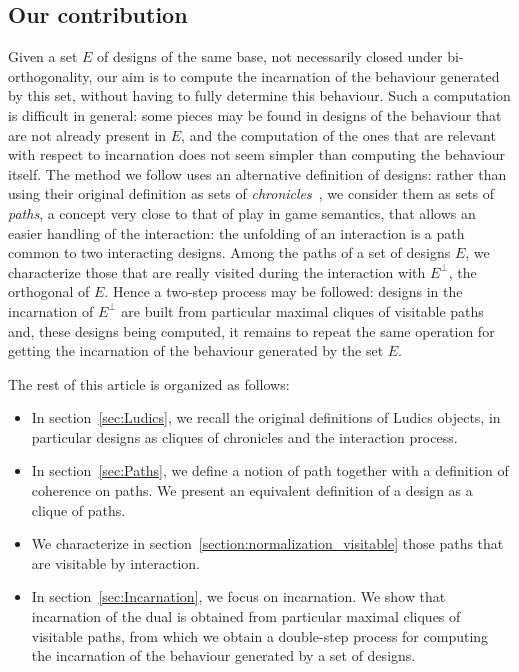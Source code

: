 \documentclass{LMCS}
\begin{document}
{\subsection{Our contribution}

Given a set $E$ of designs of the same base, not necessarily closed under bi-orthogonality, our aim is to compute the incarnation of the behaviour generated by this set, without having to fully determine this behaviour. 
Such a computation is difficult in general:
some pieces may be found in designs of the behaviour that are not already present in $E$, and the computation of the ones that are relevant with respect to incarnation does not seem simpler than computing the behaviour itself. 
The method we follow uses an alternative definition of designs: rather than using their original definition as sets of {\it chronicles}~\cite{DBLP:journals/mscs/Girard01}, 
we consider them as sets of {\em paths}, a concept very close to that of play in game semantics, that allows an easier handling of the interaction: the unfolding of an interaction is a path common to two interacting designs. 
Among the paths of a set of designs $E$, we characterize those that are really visited during the interaction with $E^\perp$, the orthogonal of $E$. 
Hence a two-step process may be followed:
designs in the incarnation of $E^\perp$ are built from particular maximal cliques of visitable paths and, these designs being computed, it remains to repeat the same operation for getting the incarnation of the behaviour generated by the set $E$.

The rest of this article is organized as follows:
\begin{itemize}
\item In section~\ref{sec:Ludics}, we recall the original definitions of Ludics objects, in particular designs as cliques of chronicles and the interaction process.
\item In section~\ref{sec:Paths}, we define a notion of path together with a definition of coherence on paths. We present an equivalent definition of a design as a clique of paths. 
\item We characterize in section~\ref{section:normalization_visitable} those paths that are visitable by interaction.
\item In section~\ref{sec:Incarnation}, we focus on incarnation. We show that incarnation of the dual is obtained from particular maximal cliques of visitable paths, from which we obtain a double-step process for computing the incarnation of the behaviour generated by a set of designs. 
\end{itemize}
}
\end{document}
